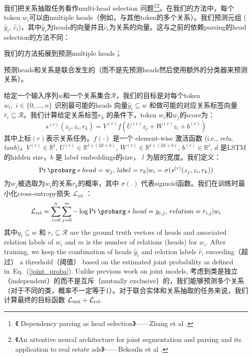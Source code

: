 \documentclass[a4paper,UTF8,no-math,zihao=-4]{ctexart}
\newcommand{\prob}{\operatorname{Pr}\probarg}
\newcommand{\ie}{i.e., }
\newcommand{\equref}[1]{Eq.~(\ref{#1})}
\begin{document}
	我们把关系抽取任务看作multi-head selection 问题\footnote{《 Dependency parsing as head selection》——Zhang et al .}\footnote{《An attentive neural architecture for joint segmentation and parsing and its application to real estate ads》——Bekoulis et al .}。在我们的方法中，每个token $ w_{i} $可以由multiple heads（例如，与其他token的多个关系）。我们预测元组	($\hat{y}_i$, $\hat{c}_i$)，其中$\hat{y}_i$为heads的向量并且$\hat{c}_i$为关系的向量。这与之前的依赖parsing的head selection的方法不同：\begin{enumerate*}[label=(\roman*)]
		\item 我们的方法拓展到预测multiple heads；
		\item 预测heads和关系是联合发生的（而不是先预测heads然后使用额外的分类器来预测关系）。
	\end{enumerate*}给定一个输入序列$w$和一个关系集合$\mathcal{R}$，我们的目标是对每个token$w_i,\;i\in\{0,...,n\}$ 识别最可能的heads 向量$\hat{y}_i\subseteq w$  和做可能的对应关系标签向量$\hat{r}_i\subseteq \mathcal{R}$。我们计算给定关系标签$r_k$ 的条件下，token $ w_{i} $和$ w_j$的score为：\begin{equation}
s^{(r)}(z_j , z_i,r_k)= V^{(r)} f (U^{(r)}  z_j + W^{(r)}  z_i+b^{(r)})
\end{equation}其中上标$(r)$表示关系任务。$f(\cdot)$ 是一个 element-wise 激活函数 (\ie \emph{relu}, \emph{tanh})，$V^{(r)} \in \mathbb{R}^{l}$, $U^{(r)} \in \mathbb{R}^{l \times (2d+b)}$, $W^{(r)} \in \mathbb{R}^{l \times (2d+b)}$, $b^{(r)} \in \mathbb{R}^{l}$, $d$ 是LSTM的hidden size，$b$ 是 label embeddings的size， $l$ 为层的宽度。我们定义：\begin{equation}\label{joint_proba}
\prob*{head=w_j,\,label=r_k |w_i}=\sigma(s^{(r)}(z_j , z_i,r_k))
\end{equation}为$ w_j $被选取为$ w_i $的关系$ r_k $的概率，其中 $\sigma(.)$ 代表sigmoid函数。我们在训练时最小化cross-entropy损失 $\mathcal{L}_\textrm{rel}$ ：\begin{equation}
\mathcal{L}_{\textrm{rel}}=\sum_{i=0}^{n}\sum_{j=0}^{m} -\log \prob*{head=y_{i,j},\,relation=r_{i,j}|w_i}
\end{equation}其中$y_i\subseteq w$ 和 $r_i\subseteq{\mathcal{R}}$ are the ground truth vectors of heads and associated relation labels of $w_i$ and $m$ is the number of relations (heads) for $w_i$. After training, we keep the combination of heads $\hat{y}_i$ and relation labels $\hat{r}_i$ exceeding（超过） a threshold（阈值） based on the estimated joint probability as defined in~\equref{joint_proba}. Unlike previous work on joint models, 考虑到类是独立（independent）的而不是互斥（mutually exclusive）的，我们能够预测多个关系（对于不同的类，概率不一定等于1）。对于联合实体和关系抽取的任务来说，我们计算最终的目标函数  $\mathcal{L}_\textsc{ner} + \mathcal{L}_\textrm{rel}$. 
\end{document}
